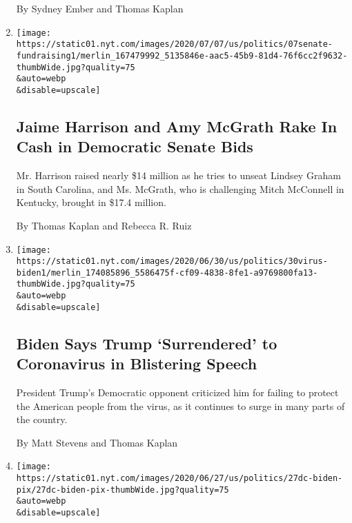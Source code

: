\begin{enumerate}
  By Sydney Ember and Thomas Kaplan
\item
  \href{/2020/07/07/us/politics/democrats-senate-fundraising.html}{}

  \texttt{[image: https://static01.nyt.com/images/2020/07/07/us/politics/07senate-fundraising1/merlin\_167479992\_5135846e-aac5-45b9-81d4-76f6cc2f9632-thumbWide.jpg?quality=75\\\&auto=webp\\\&disable=upscale]}

  \hypertarget{jaime-harrison-and-amy-mcgrath-rake-in-cash-in-democratic-senate-bids}{%
  \subsection{Jaime Harrison and Amy McGrath Rake In Cash in Democratic
  Senate
  Bids}\label{jaime-harrison-and-amy-mcgrath-rake-in-cash-in-democratic-senate-bids}}

  Mr. Harrison raised nearly \$14 million as he tries to unseat Lindsey
  Graham in South Carolina, and Ms. McGrath, who is challenging Mitch
  McConnell in Kentucky, brought in \$17.4 million.

  By Thomas Kaplan and Rebecca R. Ruiz
\item
  \href{/2020/06/30/us/politics/biden-speech-trump-coronavirus.html}{}

  \texttt{[image: https://static01.nyt.com/images/2020/06/30/us/politics/30virus-biden1/merlin\_174085896\_5586475f-cf09-4838-8fe1-a9769800fa13-thumbWide.jpg?quality=75\\\&auto=webp\\\&disable=upscale]}

  \hypertarget{biden-says-trump-surrendered-to-coronavirus-in-blistering-speech}{%
  \subsection{Biden Says Trump `Surrendered' to Coronavirus in
  Blistering
  Speech}\label{biden-says-trump-surrendered-to-coronavirus-in-blistering-speech}}

  President Trump's Democratic opponent criticized him for failing to
  protect the American people from the virus, as it continues to surge
  in many parts of the country.

  By Matt Stevens and Thomas Kaplan
\item
  \href{/2020/06/27/us/politics/biden-campaign-diversity.html}{}

  \texttt{[image: https://static01.nyt.com/images/2020/06/27/us/politics/27dc-biden-pix/27dc-biden-pix-thumbWide.jpg?quality=75\\\&auto=webp\\\&disable=upscale]}


\end{enumerate}
